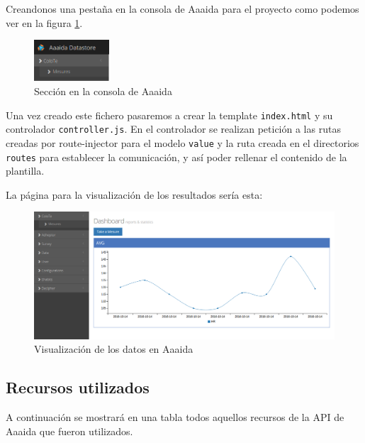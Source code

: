 Creandonos una pestaña en la consola de Aaaida para el proyecto como podemos ver en la figura \ref{sec:coioteSec}. 

\begin{figure}[htb]
\begin{center}
\includegraphics[width=0.25\textwidth]{./setup/arquitecturaCoiote}
\caption{Sección en la consola de Aaaida}
\label{sec:coioteSec}
\end{center}
\end{figure}

Una vez creado este fichero pasaremos a crear la template \texttt{index.html} y su controlador \texttt{controller.js}. En el controlador se realizan petición a las rutas creadas por route-injector para el modelo \texttt{value} y la ruta creada en el directorios \texttt{routes} para establecer la comunicación, y así poder rellenar el contenido de la plantilla.

La página para la visualización de los resultados sería esta:

\begin{figure}[htb]
\begin{center}
\includegraphics[width=1\textwidth]{./setup/visualizacionPaginaCoiote}
\caption{Visualización de los datos en Aaaida}
\end{center}
\end{figure}

\subsection{Recursos utilizados}

A continuación se mostrará en una tabla todos aquellos recursos de la API de Aaaida que fueron utilizados. 


